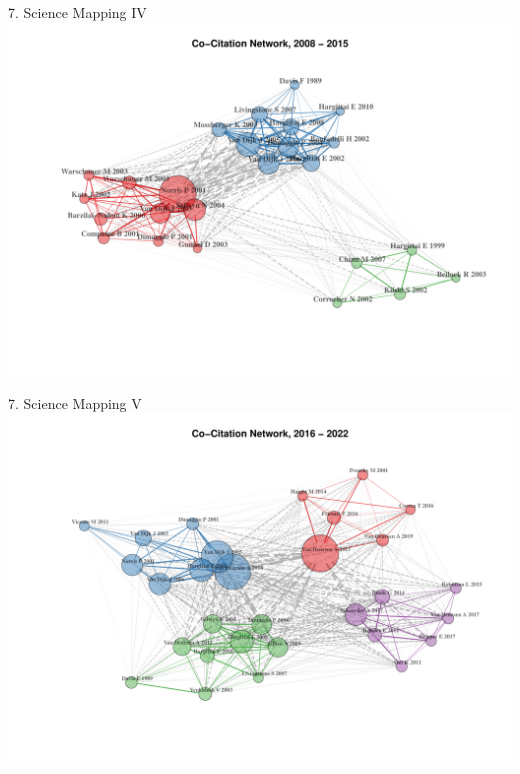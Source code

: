 \documentclass[
  ignorenonframetext,
]{beamer}
\begin{document}
\begin{frame}{7. Science Mapping IV}
\protect\hypertarget{science-mapping-iv}{}
\includegraphics{Presentation_bibliometric_files/figure-beamer/Co_cite_P2-1.pdf}
\end{frame}

\begin{frame}{7. Science Mapping V}
\protect\hypertarget{science-mapping-v}{}
\includegraphics{Presentation_bibliometric_files/figure-beamer/Co_cite_P3-1.pdf}
\end{frame}
\end{document}
